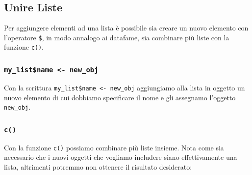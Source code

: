\documentclass[
]{book}
\newenvironment{Shaded}{\begin{snugshade}}{\end{snugshade}}
\newcommand{\CommentTok}[1]{\textcolor[rgb]{0.56,0.35,0.01}{\textit{#1}}}
\newcommand{\NormalTok}[1]{#1}
\newcommand{\OperatorTok}[1]{\textcolor[rgb]{0.81,0.36,0.00}{\textbf{#1}}}
\newcommand{\StringTok}[1]{\textcolor[rgb]{0.31,0.60,0.02}{#1}}
\begin{document}
\hypertarget{unire-liste}{%
\subsection{Unire Liste}\label{unire-liste}}

Per aggiungere elementi ad una lista è possibile sia creare un nuovo elemento con l'operatore \texttt{\$}, in modo annalogo ai datafame, sia combinare più liste con la funzione \texttt{c()}.

\hypertarget{my_listname---new_obj}{%
\subsubsection*{\texorpdfstring{\texttt{my\_list\$name\ \textless{}-\ new\_obj}}{my\_list\$name \textless- new\_obj}}\label{my_listname---new_obj}}

Con la scrittura \texttt{my\_list\$name\ \textless{}-\ new\_obj} aggiungiamo alla lista in oggetto un nuovo elemento di cui dobbiamo specificare il nome e gli assegnamo l'oggetto \texttt{new\_obj}.

\begin{Shaded}
\end{Shaded}

\hypertarget{c}{%
\subsubsection*{\texorpdfstring{\texttt{c()}}{c()}}\label{c}}

Con la funzione \texttt{c()} possiamo combinare più liste insieme. Nota come sia necessario che i nuovi oggetti che vogliamo includere siano effettivamente una lista, altrimenti potremmo non ottenere il risultato desiderato:
\end{document}

